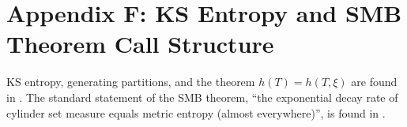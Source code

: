 \section{Appendix F: KS Entropy and SMB Theorem Call Structure}

KS entropy, generating partitions, and the theorem $h(T)=h(T,\xi)$ are found in \cite{ScholarpediaKSEntropy}.
The standard statement of the SMB theorem, ``the exponential decay rate of cylinder set measure equals metric entropy (almost everywhere)'', is found in \cite{GatechSMB}.
